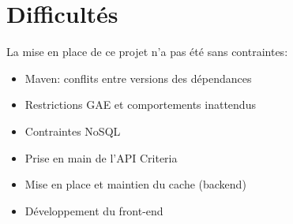\chapter{Difficultés}

La mise en place de ce projet n'a pas été sans contraintes:\\

\begin{itemize}
\item Maven: conflits entre versions des dépendances
\item Restrictions GAE et comportements inattendus
\item Contraintes NoSQL
\item Prise en main de l'API Criteria
\item Mise en place et maintien du cache (backend)
\item Développement du front-end
\end{itemize}